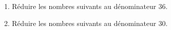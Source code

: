 \begin{corrige}
    \phantom{rrr}  

    \begin{enumerate}
        \hspace*{-5mm}\item Réduire les nombres suivants au dénominateur \num{36}.
        \begin{multicols}{2}
            \begin{enumerate}
            \end{enumerate}
        \end{multicols}
    \end{enumerate}
    \begin{enumerate}
        \setcounter{enumi}{1}
        \hspace{-5mm}\item Réduire les nombres suivants au dénominateur \num{30}.
        \begin{multicols}{2}
            \begin{enumerate}
            \end{enumerate}
        \end{multicols}
    \end{enumerate}
\end{corrige}

